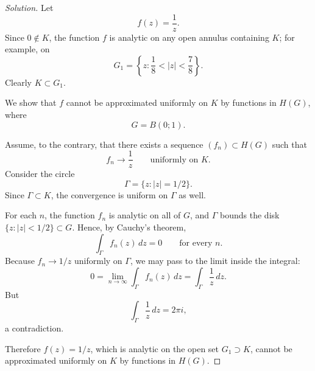 \documentclass[12pt, a4paper]{report}
\theoremstyle{spaced}
\begin{document}
\begin{proof}[Solution]
	Let
	\[
		f(z)=\frac{1}{z}.
	\]
	Since \(0\notin K\), the function \(f\) is analytic on any open annulus containing \(K\); for example, on
	\[
		G_1=\left\{z:\frac18<|z|<\frac78\right\}.
	\]
	Clearly \(K\subset G_1\).

	We show that \(f\) cannot be approximated uniformly on \(K\) by functions in \(H(G)\), where
	\[
		G=B(0;1).
	\]

	Assume, to the contrary, that there exists a sequence \((f_n)\subset H(G)\) such that
	\[
		f_n \to \frac1z
		\qquad\text{uniformly on }K.
	\]
	Consider the circle
	\[
		\Gamma=\{z:|z|=1/2\}.
	\]
	Since \(\Gamma\subset K\), the convergence is uniform on \(\Gamma\) as well.

	For each \(n\), the function \(f_n\) is analytic on all of \(G\), and \(\Gamma\) bounds the disk \(\{z:|z|<1/2\}\subset G\). Hence, by Cauchy’s theorem,
	\[
		\int_\Gamma f_n(z)\,dz=0
		\qquad\text{for every }n.
	\]
	Because \(f_n\to 1/z\) uniformly on \(\Gamma\), we may pass to the limit inside the integral:
	\[
		0
		=
		\lim_{n\to\infty}\int_\Gamma f_n(z)\,dz
		=
		\int_\Gamma \frac{1}{z}\,dz.
	\]
	But
	\[
		\int_\Gamma \frac{1}{z}\,dz=2\pi i,
	\]
	a contradiction.

	Therefore \(f(z)=1/z\), which is analytic on the open set \(G_1\supset K\), cannot be approximated uniformly on \(K\) by functions in \(H(G)\).
\end{proof}
\end{document}
